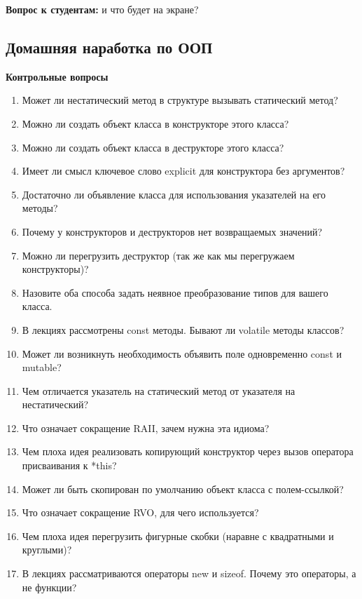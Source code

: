 \documentclass[a4paper,12pt,oneside]{article}
\newif\ifanswers
\begin{document}
\textbf{Вопрос к студентам:} и что будет на экране?

\ifanswers
Правильный ответ: частное от деления 14 на 4 это 3, на 3 это 4 и в обоих случаях 2 в остатке. Так что 3, 4, 2.
\fi

\pagebreak
\subsection{Домашняя наработка по ООП}

\textbf{Контрольные вопросы}

\begin{enumerate}
\item Может ли нестатический метод в структуре вызывать статический метод?
\item Можно ли создать объект класса в конструкторе этого класса?
\item Можно ли создать объект класса в деструкторе этого класса?
\item Имеет ли смысл ключевое слово explicit для конструктора без аргументов?
\item Достаточно ли объявление класса для использования указателей на его методы?
\item Почему у конструкторов и деструкторов нет возвращаемых значений?
\item Можно ли перегрузить деструктор (так же как мы перегружаем конструкторы)?
\item Назовите оба способа задать неявное преобразование типов для вашего класса.
\item В лекциях рассмотрены const методы. Бывают ли volatile методы классов?
\item Может ли возникнуть необходимость объявить поле одновременно const и mutable?
\item Чем отличается указатель на статический метод от указателя на нестатический?
\item Что означает сокращение RAII, зачем нужна эта идиома?
\item Чем плоха идея реализовать копирующий конструктор через вызов оператора присваивания к *this?
\item Может ли быть скопирован по умолчанию объект класса с полем-ссылкой?
\item Что означает сокращение RVO, для чего используется?
\item Чем плоха идея перегрузить фигурные скобки (наравне с квадратными и круглыми)?
\item В лекциях рассматриваются операторы new и sizeof. Почему это операторы, а не функции?

\end{enumerate}
\end{document}
